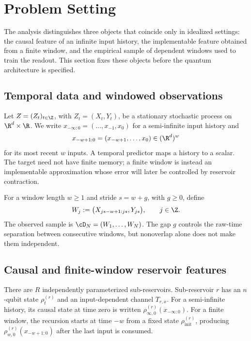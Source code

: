 \section{Problem Setting}
\label{sec:problem-setting}

The analysis distinguishes three objects that coincide only in idealized
settings: the causal feature of an infinite input history, the implementable
feature obtained from a finite window, and the empirical sample of dependent
windows used to train the readout. This section fixes these objects before the
quantum architecture is specified.

\subsection{Temporal data and windowed observations}

Let \(Z=(Z_t)_{t\in\Z}\), with \(Z_t=(X_t,Y_t)\), be a stationary stochastic
process on \(\R^d\times\R\). We write
\(x_{-\infty:0}=(\ldots,x_{-1},x_0)\) for a semi-infinite input history and
\[
    x_{-w+1:0}=(x_{-w+1},\ldots,x_0)\in(\R^d)^w
\]
for its most recent \(w\) inputs. A temporal predictor maps a history to a
scalar. The target need not have finite memory; a finite window is instead an
implementable approximation whose error will later be controlled by reservoir
contraction.

For a window length \(w\geq1\) and stride \(s=w+g\), with \(g\geq0\), define
\begin{equation}
    W_j
    :=
    \bigl(X_{js-w+1:js},Y_{js}\bigr),
    \qquad j\in\Z.
    \label{eq:window-process}
\end{equation}
The observed sample is \(\cD_N=(W_1,\ldots,W_N)\). The gap \(g\) controls the
raw-time separation between consecutive windows, but nonoverlap alone does not
make them independent.

\subsection{Causal and finite-window reservoir features}

There are \(R\) independently parameterized sub-reservoirs. Sub-reservoir
\(r\) has an \(n\)-qubit state \(\rho_t^{(r)}\) and an input-dependent channel
\(T_{r,x}\). For a semi-infinite history, its causal state at time zero is
written \(\rho_{\infty,0}^{(r)}(x_{-\infty:0})\). For a finite window, the
recursion starts at time \(-w\) from a fixed state
\(\rho_{\mathrm{init}}^{(r)}\), producing
\(\rho_{w,0}^{(r)}(x_{-w+1:0})\) after the last input is consumed.

